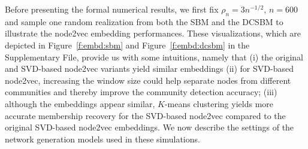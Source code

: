 \documentclass[10pt,journal,compsoc]{IEEEtran}
\numberwithin{equation}{section}
\begin{document}
Before presenting the formal numerical results, we first  fix $\rho_n = 3n^{-1/2}$, $n = 600$
and sample one random realization from both the SBM and the
DCSBM to illustrate the node2vec embedding performances. These
visualizations, which are depicted in Figure~\ref{f:embd:sbm} and
Figure~\ref{f:embd:dcsbm} in the Supplementary File, provide us with some intuitions, namely that (i) the original and SVD-based node2vec variants yield similar embeddings (ii) for SVD-based node2vec, increasing the 
window size could help separate nodes from different communities
and thereby improve the community detection accuracy; (iii) although the embeddings appear similar, $K$-means clustering yields more accurate membership recovery for the SVD-based node2vec compared to the original SVD-based node2vec embeddings. %
We now describe the settings of the network generation models used in these simulations.  
\end{document}
